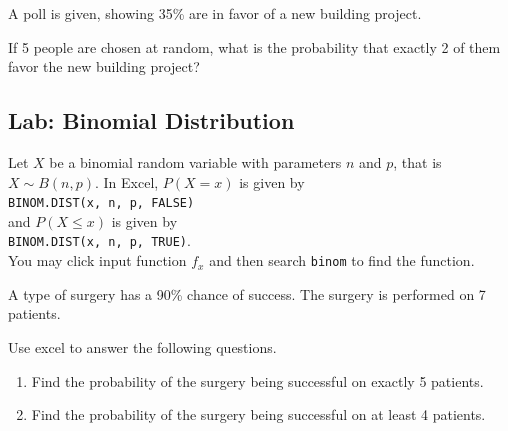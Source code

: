 \begin{exercise}

A poll is given, showing 35\% are in favor of a new building project.

If 5 people are chosen at random, what is the probability that exactly 2
of them favor the new building project?

\end{exercise}
\vspace*{5\baselineskip}

\hypertarget{lab-binomial-distribution}{%
\subsection{Lab: Binomial
Distribution}\label{lab-binomial-distribution}}

Let \(X\) be a binomial random variable with parameters \(n\) and \(p\), that is \(X\sim B(n, p)\). In Excel, \(P(X=x)\) is given by\\
\texttt{BINOM.DIST(x,\ n,\ p,\ FALSE)}\\
 and \(P(X\le x)\) is given by\\
\texttt{BINOM.DIST(x,\ n,\ p,\ TRUE)}.\\
You may click input function
\(f_x\) and then search \texttt{binom} to find the function.

\begin{exercise}

A type of surgery has a 90\% chance of success. The surgery is performed
on 7 patients.

Use excel to answer the following questions.

\begin{enumerate}
\item
  Find the probability of the surgery being successful on exactly 5
  patients.
\item
  Find the probability of the surgery being successful on at least 4
  patients.
\end{enumerate}

\end{exercise}

